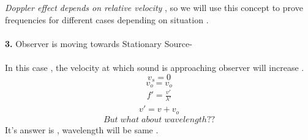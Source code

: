 \documentclass[journal,12pt,twocolumn]{IEEEtran}
\theoremstyle{remark}
\begin{document}
\textit{Doppler effect depends on relative velocity }, so we will use this concept to prove frequencies for different cases depending on situation .\\\\
\textbf{3.} Observer is moving towards Stationary Source-\\\\
In this case , the velocity at which sound is approaching observer will increase .
$$v_s = 0$$
$$v_o = v_o$$
\begin{align}f' = \frac{v'}{\lambda'}\end{align}
\begin{align}v'= v+v_o\end{align}
$$But \;what\; about\; wavelength??$$
It's answer is , wavelength will be same  .\\
\end{document}
